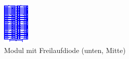 \begin{figure}[h!tb]
    \centering
    \includegraphics[width=\textwidth]{images/ltspice/jac/jacModule.eps}
    \caption{Modul mit Freilaufdiode (unten, Mitte)}
    \label{fig:ltspice:jacModule:Diode}
\end{figure}



